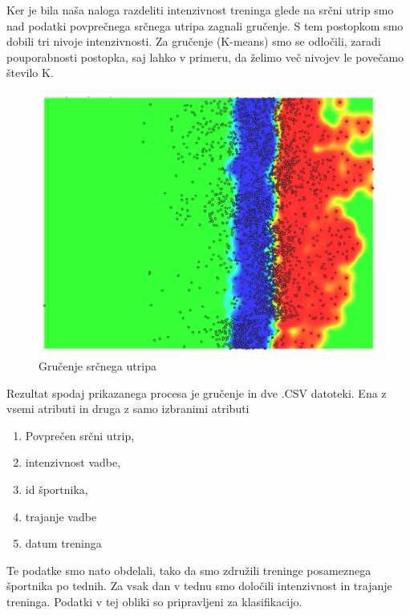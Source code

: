 \documentclass[a4paper,11pt]{article}
\begin{document}
Ker je bila naša naloga razdeliti intenzivnost treninga glede na srčni utrip smo nad podatki povprečnega srčnega utripa zagnali gručenje. S tem postopkom smo dobili tri nivoje intenzivnosti. Za gručenje (K-means) smo se odločili, zaradi pouporabnosti postopka, saj lahko v primeru, da želimo več nivojev le povečamo število K.\\

\begin{figure}[H]
\caption{Gručenje srčnega utripa}
\centering
\includegraphics[width=1\textwidth]{HrCLusters}
\end{figure}
 
Rezultat spodaj prikazanega procesa je gručenje in dve .CSV datoteki. Ena z vsemi atributi in druga z samo izbranimi atributi
\begin{enumerate}
\item{Povprečen srčni utrip,}
\item{intenzivnost vadbe,}
\item{id športnika,}
\item{trajanje vadbe}
\item{datum treninga}
\end{enumerate} 

Te podatke smo nato obdelali, tako da smo združili treninge posameznega športnika po tednih. Za vsak dan v tednu smo določili intenzivnost in trajanje treninga. Podatki v tej obliki so pripravljeni za klasifikacijo.
\end{document}
